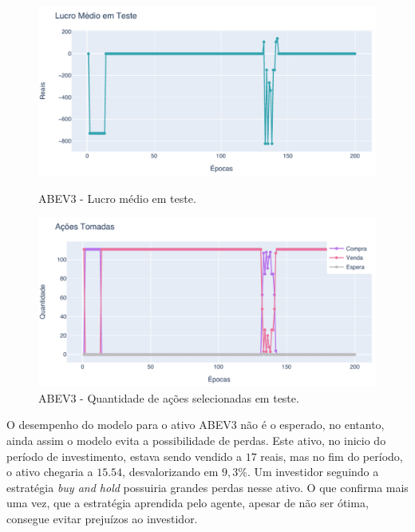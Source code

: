 \begin{figure}[htbp]
    \centering 
    \begin{minipage}[b]{0.45\linewidth}
        \includegraphics[width=\linewidth]{img/ddpg/abev3/clean/profit}
        \caption{ABEV3 - Lucro médio em teste.} 
        \label{abev_clean_profit}
    \end{minipage}
    \quad
    \begin{minipage}[b]{0.45\linewidth}
        \includegraphics[width=\linewidth]{img/ddpg/abev3/clean/actions}
        \caption{ABEV3 - Quantidade de ações selecionadas em teste.}
        \label{abev_clean_act}
    \end{minipage}
\end{figure}

O desempenho do modelo para o ativo ABEV3 não é o esperado, no entanto, ainda assim o modelo evita a possibilidade de perdas. Este ativo, no inicio do período de investimento, estava sendo vendido a $17$ reais, mas no fim do período, o ativo chegaria a $15.54$, desvalorizando em $9,3\%$. Um investidor seguindo a estratégia \emph{buy and hold} possuiria grandes perdas nesse ativo. O que confirma mais uma vez, que a estratégia aprendida pelo agente, apesar de não ser ótima, consegue evitar prejuízos ao investidor.


